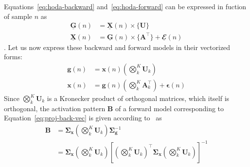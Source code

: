 \documentclass[twocolumn]{article}
\newcommand{\ten}[1]{\underline{\mathbf{#1}}} %
\newcommand{\mat}[1]{\mathbf{#1}} %
\renewcommand{\vec}[1]{\mathbf{#1}} %
\newcommand{\mmpr}[1]{\times\{#1\}} %
\begin{document}
Equations~\ref{eq:hoda-backward} and~\ref{eq:hoda-forward} can be expressed in fuction
of sample $n$ as
\begin{subequations}
	\label{eq:proj-n}
	\begin{align}
		\ten{G}(n) & = \ten{X}(n)\mmpr{\mat{U}}
		\label{eq:proj-back-n}                                                   \\
		\ten{X}(n) & = \ten{G}(n)\mmpr{\mat{A}^\intercal}+\ten{\mathbfcal{E}}(n)
		\label{eq:proj-fwd-n}
	\end{align}
\end{subequations}.
Let us now express these backward and forward models in their vectorized forms:
\begin{subequations}
	\label{eq:proj-n}
	\begin{align}
		\vec{g}(n) & = \vec{x}(n)\left(\bigotimes_k^K\mat{U}_k\right)
		\label{eq:proj-back-vec}                                                  \\
		\vec{x}(n) & = \vec{g}(n)\left(\bigotimes_k^K\mat{A}_k^\intercal\right) +
		\vec{\boldsymbol\epsilon}(n)
		\label{eq:proj-fwd-vec}
	\end{align}
\end{subequations}
Since $\bigotimes_k^K\mat{U}_k$ is a Kronecker product of orthogonal matrices,
which itself is orthogonal, the activation pattern $\mat{B}$ of a forward model
corresponding to Equation~\ref{eq:proj-back-vec} is given according
to~\cite{Haufe2014} as
\begin{align*}
	\mat{B} & =
	\mat{\Sigma}_\vec{x}\left(\bigotimes_k^K\mat{U}_k\right)\mat{\Sigma}_\vec{g}^{-1} \\
	        & =
	\mat{\Sigma}_\vec{x}\left(\bigotimes_k^K\mat{U}_k\right)\left[\left(\bigotimes_k^K\mat{U}_k\right)^\intercal\mat{\Sigma_\vec{x}}\left(\bigotimes_k^K\mat{U}_k\right)\right]^{-1}
\end{align*}
\end{document}
